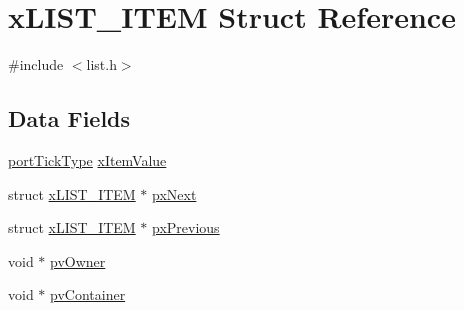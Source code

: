 \hypertarget{structx_l_i_s_t___i_t_e_m}{\section{x\-L\-I\-S\-T\-\_\-\-I\-T\-E\-M Struct Reference}
\label{structx_l_i_s_t___i_t_e_m}
}


{\ttfamily \#include $<$list.\-h$>$}

\subsection*{Data Fields}
\begin{DoxyCompactItemize}
\item 
\hyperlink{portmacro_8h_a4d746b2ff8fafc490b764c66411ec457}{port\-Tick\-Type} \hyperlink{structx_l_i_s_t___i_t_e_m_a83bf16246a7893527d5ea5d2aa7cc4bf}{x\-Item\-Value}
\item 
struct \hyperlink{structx_l_i_s_t___i_t_e_m}{x\-L\-I\-S\-T\-\_\-\-I\-T\-E\-M} $\ast$ \hyperlink{structx_l_i_s_t___i_t_e_m_aa3188b77b81a666e2f670d1942c37d90}{px\-Next}
\item 
struct \hyperlink{structx_l_i_s_t___i_t_e_m}{x\-L\-I\-S\-T\-\_\-\-I\-T\-E\-M} $\ast$ \hyperlink{structx_l_i_s_t___i_t_e_m_aeda19153a902efa73e3ee8662824d471}{px\-Previous}
\item 
void $\ast$ \hyperlink{structx_l_i_s_t___i_t_e_m_aeb54d184fbcccb5748e66cb2426e3b3f}{pv\-Owner}
\item 
void $\ast$ \hyperlink{structx_l_i_s_t___i_t_e_m_a96701cdfbb91bd7b690f188d03bf03b1}{pv\-Container}
\end{DoxyCompactItemize}


